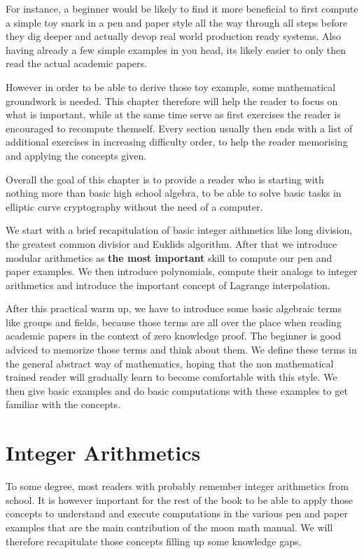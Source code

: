 For instance, a beginner would be likely to find it more beneficial to first compute a simple toy snark in a pen and paper style all the way through all steps before they dig deeper and actually devop real world production ready systems. Also having already a few simple examples in you head, its likely easier to only then read the actual academic papers. 

However in order to be able to derive those toy example, some mathematical groundwork is needed. This chapter therefore will help the reader to focus on what is important, while at the same time serve as first exercises the reader is encouraged to recompute themself. Every section usually then ends with a list of additional exercises in increasing difficulty order, to help the reader memorising and applying the concepts given. 

Overall the goal of this chapter is to provide a reader who is starting with nothing more than basic high school algebra, to be able to solve basic tasks in elliptic curve cryptography without the need of a computer.


We start with a brief recapitulation of basic integer aithmetics like long division, the greatest common divisior and Euklids algorithm. After that we introduce modular arithmetics as \textbf{the most important} skill to compute our pen and paper examples. We then introduce polynomials, compute their analogs to integer arithmetics and introduce the important concept of Lagrange interpolation.

After this practical warm up, we have to introduce some basic algebraic terms like groups and fields, because those terms are all over the place when reading academic papers in the context of zero knowledge proof. The beginner is good adviced to memorize those terms and think about them. We define these terms in the general abstract way of mathematics, hoping that the non mathematical trained reader will gradually learn to become comfortable with this style. We then give basic examples and do basic computations with these examples to get familiar with the concepts. 

\section{Integer Arithmetics}
\label{integer_arithmetics}
To some degree, most readers with probably remember integer arithmetics from school. It is however important for the rest of the book to be able to apply those concepts to understand and execute computations in the various pen and paper examples that are the main contribution of the moon math manual. We will therefore recapitulate those concepts filling up some knowledge gaps.

